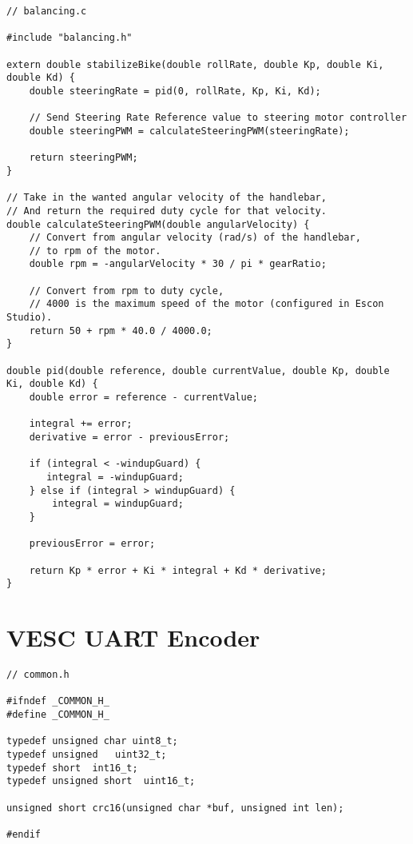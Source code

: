 \begin{lstlisting}
// balancing.c

#include "balancing.h"

extern double stabilizeBike(double rollRate, double Kp, double Ki, double Kd) {
    double steeringRate = pid(0, rollRate, Kp, Ki, Kd);

    // Send Steering Rate Reference value to steering motor controller
    double steeringPWM = calculateSteeringPWM(steeringRate);

    return steeringPWM;
}

// Take in the wanted angular velocity of the handlebar,
// And return the required duty cycle for that velocity.
double calculateSteeringPWM(double angularVelocity) {
    // Convert from angular velocity (rad/s) of the handlebar,
    // to rpm of the motor.
    double rpm = -angularVelocity * 30 / pi * gearRatio;

    // Convert from rpm to duty cycle,
    // 4000 is the maximum speed of the motor (configured in Escon Studio).
    return 50 + rpm * 40.0 / 4000.0;
}

double pid(double reference, double currentValue, double Kp, double Ki, double Kd) {
    double error = reference - currentValue;

    integral += error;
    derivative = error - previousError;

    if (integral < -windupGuard) {
       integral = -windupGuard;
    } else if (integral > windupGuard) {
        integral = windupGuard;
    }

    previousError = error;

    return Kp * error + Ki * integral + Kd * derivative;
}
\end{lstlisting}

\section{VESC UART Encoder}

\begin{lstlisting}
// common.h

#ifndef _COMMON_H_
#define _COMMON_H_

typedef unsigned char uint8_t;
typedef unsigned   uint32_t;
typedef short  int16_t;
typedef unsigned short  uint16_t;

unsigned short crc16(unsigned char *buf, unsigned int len);

#endif
\end{lstlisting}

